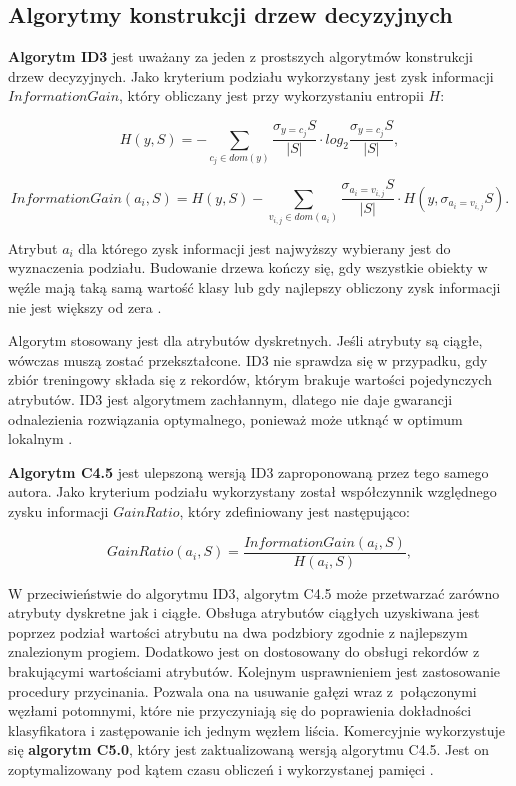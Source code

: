 \documentclass[12pt]{article}
\begin{document}
\subsection{Algorytmy konstrukcji drzew decyzyjnych}

\textbf{Algorytm ID3} jest uważany za jeden z prostszych algorytmów konstrukcji drzew decyzyjnych.
Jako kryterium podziału wykorzystany jest zysk informacji $InformationGain$, który obliczany jest
przy wykorzystaniu entropii $H$:

\begin{equation}
    H(y, S) = - \displaystyle\sum\limits_{c_j \in dom(y)}^{} \frac{\sigma_{y=c_j}S}{|S|} \cdot log_2 \frac{\sigma_{y=c_j}S}{|S|},
\end{equation}

\begin{equation}
    InformationGain(a_i, S) = H(y, S) - \displaystyle\sum\limits_{v_{i,j} \in dom(a_i)}^{} \displaystyle\frac{\sigma_{a_i=v_{i,j}}S}{|S|} \cdot H(y, \sigma_{a_i=v_{i,j}}S).
\end{equation}

Atrybut $a_i$ dla którego zysk informacji jest najwyższy wybierany jest do wyznaczenia podziału.
Budowanie drzewa kończy się, gdy wszystkie obiekty w węźle mają taką samą wartość
klasy lub gdy najlepszy obliczony zysk informacji nie jest większy od zera \cite{algorytmy-do-konstruowania-drzew-decyzyjnych}.

Algorytm stosowany jest dla atrybutów dyskretnych. Jeśli atrybuty są ciągłe, wówczas muszą
zostać przekształcone. ID3 nie sprawdza się w przypadku, gdy zbiór treningowy składa się z
rekordów, którym brakuje wartości pojedynczych atrybutów. ID3 jest algorytmem zachłannym,
dlatego nie daje gwarancji odnalezienia rozwiązania optymalnego, ponieważ może
utknąć w optimum lokalnym \cite{data-mining-with-decision-trees}.

\textbf{Algorytm C4.5} jest ulepszoną wersją ID3 zaproponowaną przez tego samego autora.
Jako kryterium podziału wykorzystany został współczynnik względnego zysku informacji $GainRatio$, który zdefiniowany jest następująco:

\begin{equation}
    GainRatio(a_i, S) = \displaystyle\frac{InformationGain(a_i, S)}{H(a_i, S)},
\end{equation}

\vspace{0.8cm}

W przeciwieństwie do algorytmu ID3, algorytm C4.5 może przetwarzać zarówno atrybuty dyskretne jak i ciągłe.
Obsługa atrybutów ciągłych uzyskiwana jest poprzez podział wartości atrybutu
na dwa podzbiory zgodnie z najlepszym znalezionym progiem.
Dodatkowo jest on dostosowany do obsługi rekordów z brakującymi wartościami atrybutów. Kolejnym usprawnieniem
jest zastosowanie procedury przycinania. Pozwala ona na usuwanie gałęzi wraz z~połączonymi węzłami potomnymi, które
nie przyczyniają się do poprawienia dokładności klasyfikatora i zastępowanie ich jednym węzłem liścia.
Komercyjnie wykorzystuje się \textbf{algorytm C5.0}, który jest zaktualizowaną wersją algorytmu C4.5.
Jest on zoptymalizowany pod kątem czasu obliczeń i wykorzystanej pamięci \cite{data-mining-with-decision-trees}.
\end{document}
